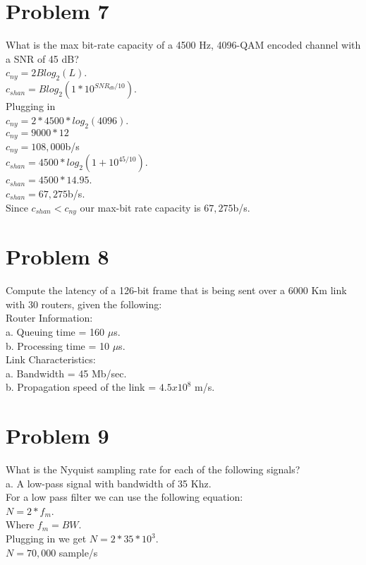 \documentclass{article}
\begin{document}
\section*{Problem 7} %
What is the max bit-rate capacity of a 4500 Hz, 4096-QAM encoded channel with a SNR of
45 dB?\\
$c_{ny} = 2B log_{2}(L)$.\\
$c_{shan} = Blog_{2}(1 * 10^{SNR_{db}/10})$.\\
Plugging in\\
$c_{ny} = 2 * 4500 * log_{2}(4096)$.\\
$c_{ny} = 9000 * 12$\\
$c_{ny} = 108,000$b/s\\
$c_{shan} = 4500 * log_{2}(1 + 10^{45/10})$.\\
$c_{shan} = 4500 * 14.95$.\\
$c_{shan} = 67,275$b/s.\\
Since $c_{shan} < c_{ny}$ our max-bit rate capacity is $67,275$b/s.\\

\section*{Problem 8}
Compute the latency of a 126-bit frame that is being sent over a 6000 Km link with 30
routers, given the following:\\
\subP Router Information:\\
\subP a. Queuing time = 160 $\mu$s.\\
\subP b. Processing time = 10 $\mu$s.\\
Link Characteristics:\\
\subP a. Bandwidth = 45 Mb/sec.\\
\subP b. Propagation speed of the link = $4.5x10^8$ m/s.\\

\section*{Problem 9} %
What is the Nyquist sampling rate for each of the following signals?\\
\subP a. A low-pass signal with bandwidth of 35 Khz.\\

For a low pass filter we can use the following equation:\\
$N = 2*f_{m}$.\\
Where $f_{m} = BW$.\\
Plugging in we get $N = 2*35 * 10^{3}$.\\
$N = 70,000$ sample/s\\
\end{document}
